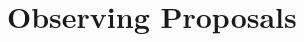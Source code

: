 \documentclass[11pt,letterpaper,sans,unicode]{moderncv}
\begin{document}

\vspace{-4mm}
\section{Observing Proposals}
\end{document}

